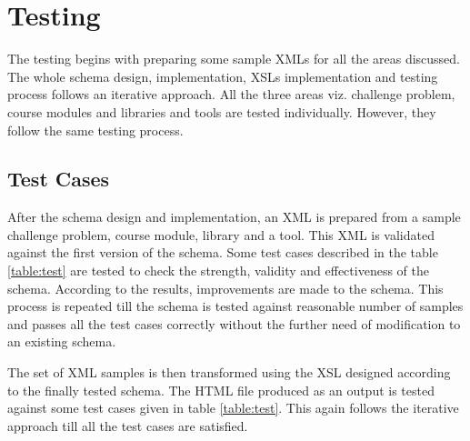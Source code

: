 \documentclass[11pt,letterpaper]{report}
\begin{document}
\chapter{Testing}

The testing begins with preparing some sample XMLs for all the areas discussed. The whole schema design, implementation, XSLs implementation and testing process follows an iterative approach. All the three areas viz. challenge problem, course modules and libraries and tools are tested individually. However, they follow the same testing process. 

\section{Test Cases}
After the schema design and implementation, an XML is prepared from a sample challenge problem, course module, library and a tool. This XML is validated against the first version of the schema. Some test cases described in the table \ref{table:test} are tested to check the strength, validity and effectiveness of the schema. According to the results, improvements are made to the schema. This process is repeated till the schema is tested against reasonable number of samples and passes all the test cases correctly without the further need of modification to an existing schema. 

The set of XML samples is then transformed using the XSL designed according to the finally tested schema. The HTML file produced as an output is tested against some test cases given in table \ref{table:test}. This again follows the iterative approach till all the test cases are satisfied.
\end{document}
